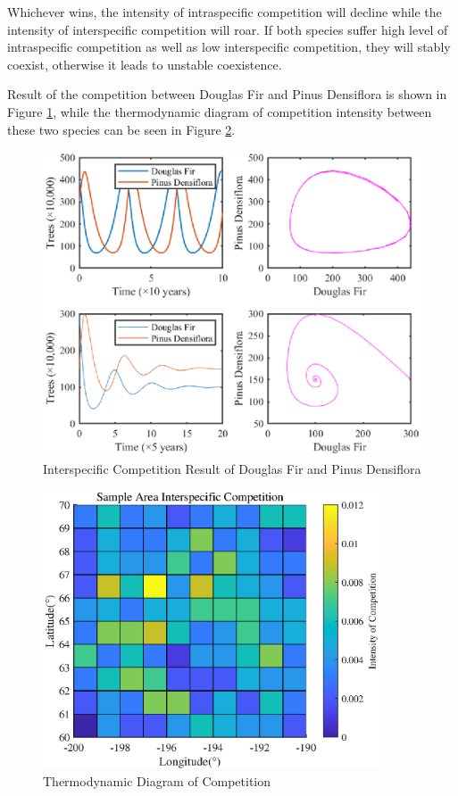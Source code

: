 \documentclass{mcmthesis}
\numberwithin{figure}{section}
\numberwithin{table}{section}
\numberwithin{equation}{section}
\begin{document}
Whichever wins, the intensity of intraspecific competition will decline while the
intensity of interspecific competition will roar. If both species suffer high level of
intraspecific competition as well as low interspecific competition, they will stably
coexist, otherwise it leads to unstable coexistence. 
\par
Result of the competition between Douglas Fir and Pinus Densiflora is shown in 
Figure \ref{Douglas Fir and Pinus Densiflora result}, while the thermodynamic diagram
of competition intensity between these two species can be seen in Figure \ref{Matrix Douglas Fir and Pinus Densiflora}.

\begin{figure}[htbp]
  \centering
  \includegraphics[width = 14cm]{code&pic/Interspecies.eps}
  \caption{Interspecific Competition Result of Douglas Fir and Pinus Densiflora}\label{Douglas Fir and Pinus Densiflora result}
\end{figure}

\begin{figure}[htbp]
  \centering
  \includegraphics[width = 10cm]{code&pic/Interspecies-matrix.eps}
  \caption{Thermodynamic Diagram of Competition}\label{Matrix Douglas Fir and Pinus Densiflora}
\end{figure}
\end{document}
